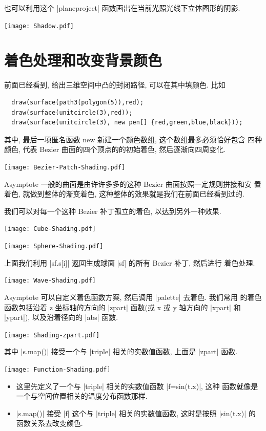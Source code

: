\documentclass[nofonts,CJKnormalspaces]{ctexbook}
\begin{document}
也可以利用这个 |planeproject| 函数画出在当前光照光线下立体图形的阴影.
\begin{center}\texttt{[image: Shadow.pdf]}\end{center}%


\section{着色处理和改变背景颜色}
前面已经看到, 给出三维空间中凸的封闭路径, 可以在其中填颜色. 比如
\begin{lstlisting}
  draw(surface(path3(polygon(5)),red);
  draw(surface(unitcircle(3),red));
  draw(surface(unitcircle(3), new pen[] {red,green,blue,black}));
\end{lstlisting}
其中, 最后一项匿名函数 new 新建一个颜色数组, 这个数组最多必须恰好包含
四种颜色, 代表 Bezier 曲面的四个顶点的的初始着色, 然后逐渐向四周变化.
\begin{center}\texttt{[image: Bezier-Patch-Shading.pdf]}\end{center}%

Asymptote 一般的曲面是由许许多多的这种 Bezier 曲面按照一定规则拼接和安
置着色, 就做到整体的渐变着色, 这种整体的效果就是我们在前面已经看到过的.

我们可以对每一个这种 Bezier 补丁孤立的着色, 以达到另外一种效果.
\begin{center}\texttt{[image: Cube-Shading.pdf]}\end{center}%

\begin{center}\texttt{[image: Sphere-Shading.pdf]}\end{center}%

上面我们利用 |sf.s[i]| 返回生成球面 |sf| 的所有 Bezier 补丁, 然后进行
着色处理.
\begin{center}\texttt{[image: Wave-Shading.pdf]}\end{center}%


Asymptote 可以自定义着色函数方案, 然后调用 |palette| 去着色. 我们常用
的着色函数包括沿着 z 坐标轴的方向的 |zpart| 函数(或 x 或 y 轴方向的
|xpart| 和 |ypart|), 以及沿着径向的 |abs| 函数.
\begin{center}\texttt{[image: Shading-zpart.pdf]}\end{center}%

其中 |s.map()| 接受一个与 |triple| 相关的实数值函数, 上面是 |zpart| 函数.
\begin{center}\texttt{[image: Function-Shading.pdf]}\end{center}%

\begin{itemize}
\item 这里先定义了一个与 |triple| 相关的实数值函数 |f=sin(t.x)|, 这种
  函数就像是 一个与空间位置相关的温度分布函数那样.
\item  |s.map()| 接受 |f| 这个与 |triple| 相关的实数值函数, 这时是按照
  |sin(t.x)| 的函数关系去改变颜色.
\end{itemize}
\end{document}
